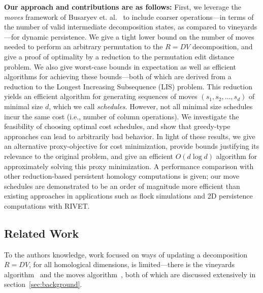 \documentclass{siamart190516}
\begin{document}
\textbf{Our approach and contributions are as follows:} First, we leverage the \emph{moves} framework of Busaryev et. al.~\cite{busaryev2010tracking} to include  coarser  operations---in terms of the number of valid intermediate decomposition states, as compared to vineyards---for dynamic persistence. 
We give a tight lower bound on the number of moves needed to perform an arbitrary permutation to the $R = D V$ decomposition, and give a proof of optimality by a reduction to the permutation edit distance problem.
We also give worst-case bounds in expectation as well as efficient algorithms for achieving these bounds---both of which are derived from a reduction to the Longest Increasing Subsequence (LIS) problem. 
This reduction yields an efficient algorithm for generating sequences of moves $( s_1, s_2, \dots, s_d )$ of minimal size $d$, which we call \emph{schedules}. 
However, not all minimal size schedules incur the same  cost 
(i.e., number of column operations).
We investigate the feasibility of choosing optimal cost schedules, and show that 
greedy-type approaches can lead to arbitrarily bad behavior. 
In light of these results, we give an alternative proxy-objective for cost minimization, provide bounds justifying its relevance to the original problem, and give an efficient $O(d \log d)$ algorithm for approximately solving this proxy minimization. 
A performance comparison with other reduction-based persistent homology computations is given; 
our move schedules are demonstrated to be an order of magnitude more efficient than existing approaches in applications such as flock simulations and 2D persistence computations with RIVET. 
   
\subsection{Related Work}\label{sec:related_work} 
To the authors knowledge, work focused on ways of updating a  decomposition $R = DV$, for all homological dimensions, is limited---there is the vineyards algorithm~\cite{cohen2006vines} and the moves algorithm~\cite{busaryev2010tracking}, both of which are discussed extensively in section~\ref{sec:background}. 
\end{document}
